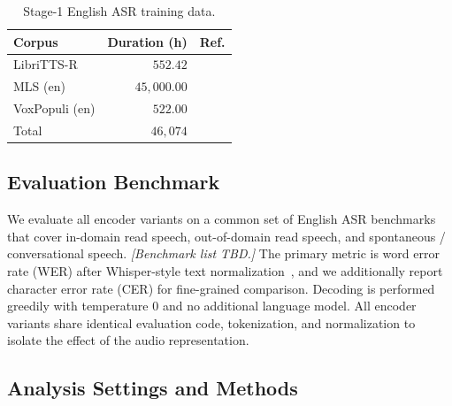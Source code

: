 \begin{table}[t]
\centering
\caption{Stage-1 English ASR training data.}
\label{tab:datasets}
\small
\begin{tabular}{lrl}
\toprule
Corpus & Duration (h) & Ref. \\
\midrule
LibriTTS-R           & $552.42$      & \cite{Ko23} \\
MLS (en)             & $45{,}000.00$ & \cite{Pr20} \\
VoxPopuli (en)       & $522.00$      & \cite{Wa21} \\
\midrule
Total                & $46{,}074$    &             \\
\bottomrule
\end{tabular}
\end{table}

\subsection{Evaluation Benchmark}
\label{sec:method:eval}


We evaluate all encoder variants on a common set of English ASR benchmarks that cover in-domain read speech, out-of-domain read speech, and spontaneous / conversational speech.
\emph{[Benchmark list TBD.]}
The primary metric is word error rate (WER) after Whisper-style text normalization~\cite{Wh23}, and we additionally report character error rate (CER) for fine-grained comparison.
Decoding is performed greedily with temperature $0$ and no additional language model.
All encoder variants share identical evaluation code, tokenization, and normalization to isolate the effect of the audio representation.

\subsection{Analysis Settings and Methods}
\label{sec:method:analysis}

